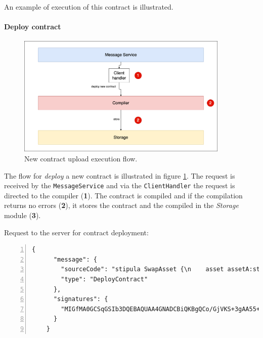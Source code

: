 An example of execution of this contract is illustrated.

\paragraph{Deploy contract}

\begin{figure}[htbp]
	\begin{center}
		\includegraphics[width=0.9\textwidth]{immagini/capitolo-5/deploy-contract-flow.png}
		\caption{New contract upload execution flow.}
		\label{fig:deploy-contract-flow}
	\end{center}
\end{figure}

The flow for \textit{deploy} a new contract is illustrated in figure \ref{fig:deploy-contract-flow}. The 
request is received by the \verb|MessageService| and via the \verb|ClientHandler| the request is directed 
to the compiler (\textbf{1}). The contract is compiled and if the compilation returns no errors 
(\textbf{2}), it stores the contract and the compiled in the \textit{Storage} module (\textbf{3}).

Request to the server for contract deployment:
{
  \small
  \begin{Verbatim}[numbers=left,xleftmargin=1cm,firstnumber=1,breaklines=true,breakanywhere=true,tabsize=2]
    {
      "message": {
        "sourceCode": "stipula SwapAsset {\n    asset assetA:stipula_assetA_ed8i9wk, assetB:stipula_assetB_pl1n5cc\n    field amountAssetA, amountAssetB\n    init Inactive\n\n    agreement (Alice, Bob)(amountAssetA, amountAssetB) {\n        Alice, Bob: amountAssetA, amountAssetB\n    } ==> @Inactive\n\n    @Inactive Alice : depositAssetA()[y]\n        (y == amountAssetA) {\n            y -o assetA;\n            _\n    } ==> @Swap\n\n    @Swap Bob : depositAssetBAndSwap()[y]\n        (y == amountAssetB) {\n            y -o assetB\n            assetB -o Alice\n            assetA -o Bob;\n            _\n    } ==> @End\n}",
        "type": "DeployContract"
      },
      "signatures": {
        "MIGfMA0GCSqGSIb3DQEBAQUAA4GNADCBiQKBgQCo/GjVKS+3gAA55+kko41yINdOcCLQMSBQyuTTkKHE1mhu/TgOpivM0wLPsSga8hQMr3+v3aR0IF/vfCRf6SdiXmWx/jflmEXtnT6fkGcnV6dGNUpHWXSpwUIDt0N88jfnEqekx4S+KDCKg99sGEeHeT65fKS8lB0gjHMt9AOriwIDAQAB": "V5gJHSax5J5nWYZlyhJr+RdJhbWrog9/urvyfWPTNWf6jkLRT16xAdLYBR1NucOmKTf9iW6mVMVpUxtrGPXktTUEIzxJpp81jR06hDBUpH0Eu6pkiw9nomTUZvuCX9DR/+WOSBz0jMO5lOznl6At3OP1mXsgNyRtPJTi2q4yHs0="
      }
    }
  \end{Verbatim}
}


